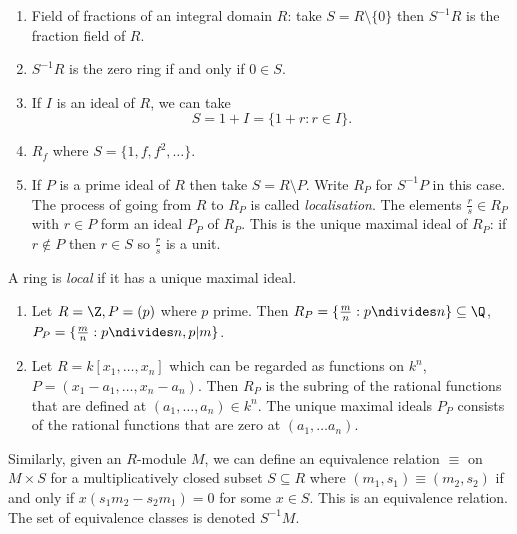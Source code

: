 \documentclass[a4paper]{article}
\begin{document}
\begin{eg}\leavevmode
  \begin{enumerate}
  \item Field of fractions of an integral domain \(R\): take \(S = R \setminus \{0\}\) then \(S^{-1}R\) is the fraction field of \(R\).
  \item \(S^{-1}R\) is the zero ring if and only if \(0 \in S\).
  \item If \(I\) is an ideal of \(R\), we can take
    \[
      S = 1 + I = \{1 + r: r \in I\}.
    \]
  \item \(R_f\) where \(S = \{1, f, f^2, \dots\}\).
  \item If \(P\) is a prime ideal of \(R\) then take \(S = R \setminus P\). Write \(R_P\) for \(S^{-1}P\) in this case. The process of going from \(R\) to \(R_P\) is called \emph{localisation}. The elements \(\frac{r}{s} \in R_P\) with \(r \in P\) form an ideal \(P_P\) of \(R_P\). This is the unique maximal ideal of \(R_P\): if \(r \notin P\) then \(r \in S\) so \(\frac{r}{s}\) is a unit.
  \end{enumerate}
\end{eg}

\begin{definition}
  A ring is \emph{local} if it has a unique maximal ideal.
\end{definition}

\begin{eg}\leavevmode
  \begin{enumerate}
  \item Let \(R = \Z, P = (p)\) where \(p\) prime. Then \(R_P = \{\frac{m}{n}: p \ndivides n\} \subseteq \Q\), \(P_P = \{\frac{m}{n}: p \ndivides n, p |m\}\).
  \item Let \(R = k[x_1, \dots, x_n]\) which can be regarded as functions on \(k^n\), \(P = (x_1 - a_1, \dots, x_n - a_n)\). Then \(R_P\) is the subring of the rational functions that are defined at \((a_1, \dots, a_n) \in k^n\). The unique maximal ideals \(P_P\) consists of the rational functions that are zero at \((a_1, \dots a_n)\).
  \end{enumerate}
\end{eg}

Similarly, given an \(R\)-module \(M\), we can define an equivalence relation \(\equiv\) on \(M \times S\) for a multiplicatively closed subset \(S \subseteq R\) where \((m_1, s_1) \equiv (m_2, s_2)\) if and only if \(x(s_1m_2 - s_2m_1) = 0\) for some \(x \in S\). This is an equivalence relation. The set of equivalence classes is denoted \(S^{-1}M\).
\end{document}
